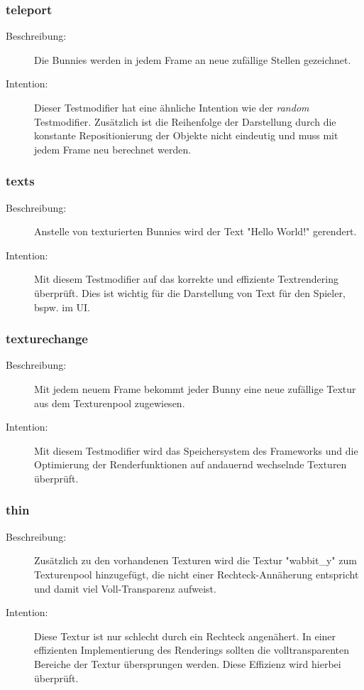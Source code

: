 \subsubsection{teleport}
\begin{description}
\item[Beschreibung:] Die Bunnies werden in jedem Frame an neue zufällige Stellen gezeichnet. \\
\item[Intention:] Dieser Testmodifier hat eine ähnliche Intention wie der \emph{random} Testmodifier. Zusätzlich ist die Reihenfolge der Darstellung durch die konstante Repositionierung der Objekte nicht eindeutig und muss mit jedem Frame neu berechnet werden.
\end{description}

\subsubsection{texts}
\begin{description}
\item[Beschreibung:] Anstelle von texturierten Bunnies wird der Text "Hello World!" gerendert. \\
\item[Intention:] Mit diesem Testmodifier auf das korrekte und effiziente Textrendering überprüft. Dies ist wichtig für die Darstellung von Text für den Spieler, bspw. im UI.
\end{description}

\subsubsection{texturechange}
\begin{description}
\item[Beschreibung:] Mit jedem neuem Frame bekommt jeder Bunny eine neue zufällige Textur aus dem Texturenpool zugewiesen. \\
\item[Intention:] Mit diesem Testmodifier wird das Speichersystem des Frameworks und die Optimierung der Renderfunktionen auf andauernd wechselnde Texturen überprüft.
\end{description}

\subsubsection{thin}
\begin{description}
\item[Beschreibung:] Zusätzlich zu den vorhandenen Texturen wird die Textur "wabbit\_y" zum Texturenpool hinzugefügt, die nicht einer Rechteck-Annäherung entspricht und damit viel Voll-Transparenz aufweist. \\
\item[Intention:] Diese Textur ist nur schlecht durch ein Rechteck angenähert. In einer effizienten Implementierung des Renderings sollten die volltransparenten Bereiche der Textur übersprungen werden. Diese Effizienz wird hierbei überprüft.
\end{description}

